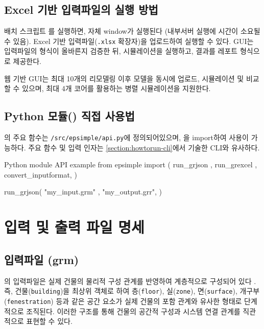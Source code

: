 \section{Excel 기반 입력파일의 실행 방법}
\label{section:howtorun-excellauncher}

배치 스크립트 를 실행하면, 자체 window가 실행된다 (내부서버 실행에 시간이 소요될 수 있음). Excel 기반 입력파일(\texttt{.xlsx} 확장자)을 업로드하여 \simulator \를 실행할 수 있다. GUI는 입력파일의 형식이 올바른지 검증한 뒤, 시뮬레이션을 실행하고, 결과를 레포트 형식으로 제공한다.

웹 기반 GUI는 최대 10개의 리모델링 이후 모델을 동시에 업로드, 시뮬레이션 및 비교할 수 있으며, 최대 4개 코어를 활용하는 병렬 시뮬레이션을 지원한다.


\section{Python 모듈(\pymodule) 직접 사용법}
\label{section:howtorun-pythonmodule}

\pymodule 의 주요 함수는 \texttt{/src/epsimple/api.py}에 정의되어있으며, \pymodule 을 import하여 사용이 가능하다. 주요 함수 및 입력 인자는 \ref{section:howtorun-cli}에서 기술한 CLI와 유사하다.

\begin{codeblock}{Python module API example}
from epsimple import (
  run_grjson         ,
  run_grexcel        ,
  convert_inputformat,
)

run_grjson(
  "my_input.grm" ,
  "my_output.grr",
)
\end{codeblock}


\chapter{입력 및 출력 파일 명세}

\section{입력파일 (grm)}
\label{section:format-explanation-grm}

\simulator 의 입력파일은 실제 건물의 물리적 구성 관계를 반영하여 계층적으로 구성되어 있다 . 즉, 건물(\texttt{building})을 최상위 객체로 하여 층(\texttt{floor}), 실(\texttt{zone}), 면(\texttt{surface}), 개구부(\texttt{fenestration}) 등과 같은 공간 요소가 실제 건물의 포함 관계와 유사한 형태로 단계적으로 조직된다. 이러한 구조를 통해 건물의 공간적 구성과 시스템 연결 관계를 직관적으로 표현할 수 있다.

